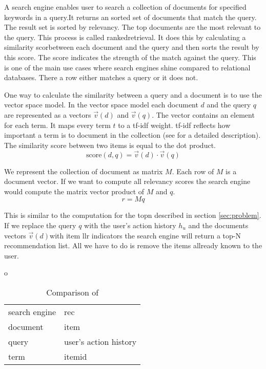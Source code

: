 A search engine enables user to search a collection of documents for specified keywords in a query.It returns an sorted set of documents that match the query. The result set is sorted by relevancy. The top documents are the most relevant to the query. This process is called \gls{rankedretrieval}. It does this by calculating a similarity scorbetween each document and the query and then sorts the result by this score. The score indicates the strength of the match against the query. This is one of the main use cases where search engines shine compared to relational databases. There a row either matches a query or it does not. 

One way to calculate the similarity between a query and a document is to use the vector space model.
In the vector space model each document $d$ and the query $q$ are represented as a vectors $\vec{v}(d)$ and $\vec{v}(q)$. The vector contains an element for each term. It maps every term $t$ to a tf-idf weight. tf-idf reflects how important a term is to document in the collection (see \cite{Manning} for a detailed description). 
The similarity score between two items is equal to the dot product.
\begin{equation}
  \label{eq:score}
  \text{score}(d,q) = \vec{v}(d) \cdot \vec{v}(q)
\end{equation}

We represent the collection of document as matrix $M$. Each row of $M$ is a document vector. If we want to compute all relevancy scores the search engine would compute the matrix vector product of $M$ and $q$.
\begin{equation}
  \label{eq:ser}
  r = M q
\end{equation}

This is similar to the computation for the \gls{topn} described in section \ref{sec:problem}. If we replace the query $q$ with the user's action history $h_u$ and the documents vectors  $\vec{v}(d)$with item \gls{llr} indicators the search engine will return a top-N recommendation list. All we have to do is remove the items allready known to the user.

o

\begin{table}
\begin{center}
\begin{tabular}{ll}
 search engine & \gls{rec}\\
 document & item\\
 query & user's action history \\
term & itemid \\
\end{tabular}
\end{center}
\caption{Comparison of }
\label{tbl:llr}
\end{table}

